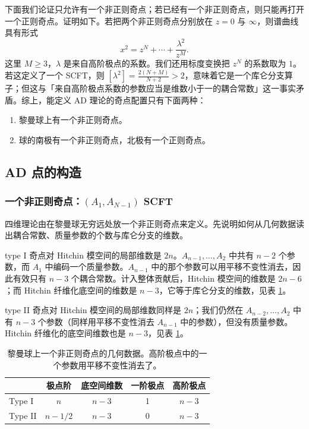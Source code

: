 下面我们论证只允许有一个非正则奇点；若已经有一个非正则奇点，则只能再打开一个正则奇点。证明如下。若把两个非正则奇点分别放在 $z=0$ 与 $\infty$，则谱曲线具有形式
\begin{equation}
x^2 = z^N + \cdots + \frac{\lambda^2}{z^M}.
\label{eq:4.3}\tag{4.3}
\end{equation}
这里 $M\ge 3$，$\lambda$ 是来自高阶极点的系数。我们还用标度变换把 $z^N$ 的系数取为 $1$。若这定义了一个 SCFT，则 $[\lambda^2]=\frac{2(N+M)}{N+2}>2$，意味着它是一个库仑分支算子；但这与「来自高阶极点系数的参数应当是维数小于一的耦合常数」这一事实矛盾。综上，能定义 AD 理论的奇点配置只有下面两种：
\begin{enumerate}
  \item 黎曼球上有一个非正则奇点。
  \item 球的南极有一个非正则奇点，北极有一个正则奇点。
\end{enumerate}

\subsection{AD 点的构造}
\label{sec:4.1}

\subsubsection{一个非正则奇点：$(A_1,A_{N-1})$ SCFT}
\label{sec:4.1.1}

四维理论由在黎曼球无穷远处放一个非正则奇点来定义。先说明如何从几何数据读出耦合常数、质量参数的个数与库仑分支的维数。

type I 奇点对 Hitchin 模空间的局部维数是 $2n$。$A_{n-1},\dots,A_2$ 中共有 $n-2$ 个参数，而 $A_1$ 中编码一个质量参数。$A_{n-1}$ 中的那个参数可以用平移不变性消去，因此有效只有 $n-3$ 个耦合常数。计入整体贡献后，Hitchin 模空间的维数是 $2n-6$；而 Hitchin 纤维化底空间的维数是 $n-3$，它等于库仑分支的维数，见表 \ref{tab:1}。

type II 奇点对 Hitchin 模空间的局部维数同样是 $2n$；我们仍然在 $A_{n-2},\dots,A_2$ 中有 $n-3$ 个参数（同样用平移不变性消去 $A_{n-1}$ 中的参数），但没有质量参数。Hitchin 纤维化的底空间维数也是 $n-3$，见表 \ref{tab:1}。

\begin{table}[tbp]
\centering
\caption{黎曼球上一个非正则奇点的几何数据。高阶极点中的一个参数用平移不变性消去了。}
\label{tab:1}
\begin{tabular}{lcccc}
\toprule
 & 极点阶 & 底空间维数 & 一阶极点 & 高阶极点\\
\midrule
Type I  & $n$        & $n-3$ & 1 & $n-3$\\
Type II & $n-1/2$    & $n-3$ & 0 & $n-3$\\
\bottomrule
\end{tabular}
\end{table}

